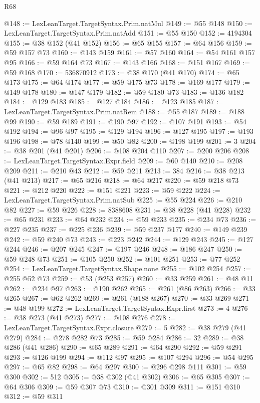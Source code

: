 \begin{lexlean}{R68}
\begin{coremodule}
@148 := LexLeanTarget.TargetSyntax.Prim.natMul
@149 := @55 @148
@150 := LexLeanTarget.TargetSyntax.Prim.natAdd
@151 := @55 @150
@152 := 4194304
@155 := @38 @152 (@41 @152)
@156 := @65 @155
@157 := @64 @156
@159 := @59 @157 @73
@160 := @143 @159
@161 := @57 @160
@164 := @54 @161 @157 @95
@166 := @59 @164 @73
@167 := @143 @166
@168 := @151 @167
@169 := @59 @168
@170 := 536870912
@173 := @38 @170 (@41 @170)
@174 := @65 @173
@175 := @64 @174
@177 := @59 @175 @73
@178 := @169 @177
@179 := @149 @178
@180 := @147 @179
@182 := @59 @180 @73
@183 := @136 @182
@184 := @129 @183
@185 := @127 @184
@186 := @123 @185
@187 := LexLeanTarget.TargetSyntax.Prim.natRem
@188 := @55 @187
@189 := @188 @99
@190 := @59 @189
@191 := @190 @97
@192 := @107 @191
@193 := @54 @192
@194 := @96 @97
@195 := @129 @194
@196 := @127 @195
@197 := @193 @196
@198 := @78 @140
@199 := @50 @82
@200 := @198 @199
@201 := 3
@204 := @38 @201 (@41 @201)
@206 := @108 @204 @110
@207 := @200 @206
@208 := LexLeanTarget.TargetSyntax.Expr.field
@209 := @60 @140
@210 := @208 @209
@211 := @210 @43
@212 := @59 @211
@213 := 384
@216 := @38 @213 (@41 @213)
@217 := @65 @216
@218 := @64 @217
@220 := @59 @218 @73
@221 := @212 @220
@222 := @151 @221
@223 := @59 @222
@224 := LexLeanTarget.TargetSyntax.Prim.natSub
@225 := @55 @224
@226 := @210 @82
@227 := @59 @226
@228 := 8388608
@231 := @38 @228 (@41 @228)
@232 := @65 @231
@233 := @64 @232
@234 := @59 @233
@235 := @234 @73
@236 := @227 @235
@237 := @225 @236
@239 := @59 @237 @177
@240 := @149 @239
@242 := @59 @240 @73
@243 := @223 @242
@244 := @129 @243
@245 := @127 @244
@246 := @207 @245
@247 := @197 @246
@248 := @186 @247
@250 := @59 @248 @73
@251 := @105 @250
@252 := @101 @251
@253 := @77 @252
@254 := LexLeanTarget.TargetSyntax.Shape.none
@255 := @102 @254
@257 := @255 @52 @73
@259 := @53 (@253 @257)
@260 := @33 @259
@261 := @48 @11
@262 := @234 @97
@263 := @190 @262
@265 := @261 (@86 @263)
@266 := @33 @265
@267 := @62 @262
@269 := @261 (@188 @267)
@270 := @33 @269
@271 := @48 @199
@272 := LexLeanTarget.TargetSyntax.Expr.first
@273 := 4
@276 := @38 @273 (@41 @273)
@277 := @108 @276
@278 := LexLeanTarget.TargetSyntax.Expr.closure
@279 := 5
@282 := @38 @279 (@41 @279)
@284 := @278 @282 @73
@285 := @59 @284
@286 := 32
@289 := @38 @286 (@41 @286)
@290 := @65 @289
@291 := @64 @290
@292 := @59 @291
@293 := @126 @199
@294 := @112 @97
@295 := @107 @294
@296 := @54 @295
@297 := @65 @82
@298 := @64 @297
@300 := @296 @298 @111
@301 := @59 @300
@302 := 512
@305 := @38 @302 (@41 @302)
@306 := @65 @305
@307 := @64 @306
@309 := @59 @307 @73
@310 := @301 @309
@311 := @151 @310
@312 := @59 @311

\end{coremodule}
\end{lexlean}
